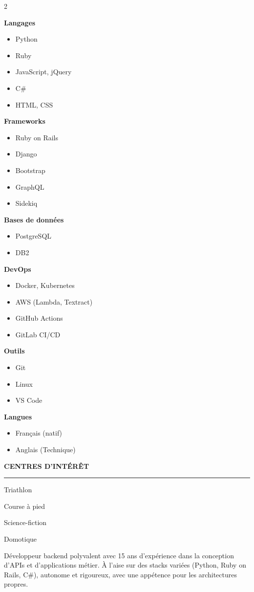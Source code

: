 \documentclass[a4paper,10pt]{article}
\newcommand{\lsection}[1]{%
  \vspace{18pt}%
  {\color{white}\bfseries\uppercase{#1}}%
  \par\vspace{-4pt}%
  {\color{white!50!sidecolor}\rule{\linewidth}{0.5pt}}%
  \vspace{4pt}%
}
\newcommand{\skillcategory}[2]{%
  \vspace{5pt}
  {\color{white}\small\bfseries #1}\par\vspace{1pt}
  \begin{itemize}[leftmargin=10pt, itemsep=0pt, topsep=0pt, parsep=0pt, label={\color{textside}\tiny\textbullet}]
    \color{textside}\small #2
  \end{itemize}
}
\newcommand{\interest}[2]{%
  {\color{white} #1\enspace\small #2}\par\vspace{3pt}%
}
\begin{document}
\begin{paracol}{2}
\begin{leftcolumn}
\begin{minipage}[t]{\dimexpr\linewidth-20pt}
\skillcategory{Langages}{\item Python \item Ruby \item JavaScript, jQuery \item C\# \item HTML, CSS}
\skillcategory{Frameworks}{\item Ruby on Rails \item Django \item Bootstrap \item GraphQL \item Sidekiq}
\skillcategory{Bases de données}{\item PostgreSQL \item DB2}
\skillcategory{DevOps}{\item Docker, Kubernetes \item AWS (Lambda, Textract) \item GitHub Actions \item GitLab CI/CD}
\skillcategory{Outils}{\item Git \item Linux \item VS Code}

\vspace{4pt}
\skillcategory{Langues}{\item Français (natif) \item Anglais (Technique)}

\lsection{Centres d'intérêt}

\interest{\faSwimmer}{Triathlon}
\interest{\faRunning}{Course à pied}
\interest{\faBook}{Science-fiction}
\interest{\faHome}{Domotique}

\vspace{\fill}
\end{minipage}
\end{leftcolumn}

\begin{rightcolumn}

\hspace*{7pt}%
\vspace*{0pt}
\begin{minipage}[t]{\dimexpr\linewidth-19pt}

\vspace*{5pt}
{\small Développeur backend polyvalent avec 15 ans d'expérience dans la conception d'APIs et d'applications métier. À l'aise sur des stacks variées (Python, Ruby on Rails, C\#), autonome et rigoureux, avec une appétence pour les architectures propres.}


\end{minipage}
\end{rightcolumn}
\end{paracol}
\end{document}

